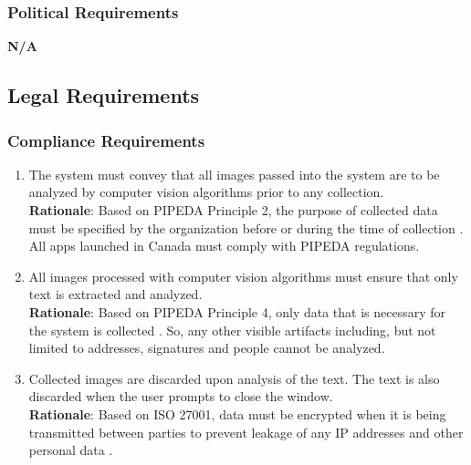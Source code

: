 \subsubsection{Political Requirements}
\label{ssub:political_requirements}
\textbf{N/A}


\subsection{Legal Requirements}
\label{sub:legal_requirements}

\subsubsection{Compliance Requirements}
\label{ssub:compliance_requirements}
\begin{enumerate}[{LR-COMP}1. ]
	\item The system must convey that all images passed into the system are to be analyzed by computer vision algorithms prior to any collection.
	\\ \textbf{Rationale}: Based on PIPEDA Principle 2, the purpose of collected data must be specified by the organization before or during the time of collection \cite{PIPEDA2025}. All apps launched in Canada must comply with PIPEDA regulations.
	\item All images processed with computer vision algorithms must ensure that only text is extracted and analyzed.
	\\ \textbf{Rationale}: Based on PIPEDA Principle 4, only data that is necessary for the system is collected \cite{PIPEDA2025}. So, any other visible artifacts including, but not limited to addresses, signatures and people cannot be analyzed.
	\item Collected images are discarded upon analysis of the text. The text is also discarded when the user prompts to close the window.
	\\ \textbf{Rationale}: Based on ISO 27001, data must be encrypted when it is being transmitted between parties to prevent leakage of any IP addresses and other personal data \cite{ISMS2025}.
\end{enumerate}

